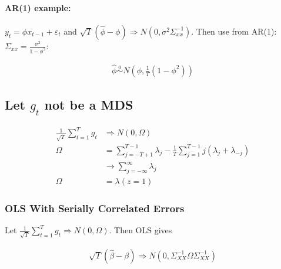 

\paragraph{AR(1) example:} $y_t = \phi x_{t-1}+\varepsilon_t$ and $\sqrt{T}(\widehat{\phi}-\phi) \Rightarrow N\left(0, \sigma^2 \Sigma_{x x}^{-1} \right)$. Then use from AR(1): $\Sigma_{x x}=\frac{\sigma^2}{1-\phi^2}$:

\begin{align*}
    \widehat{\phi} \stackrel{a}{\sim} N\left(\phi, \frac{1}{T}\left(1-\phi^2\right)\right)
\end{align*}

\subsection{Let $g_t$ not be a MDS}

\begin{align*}
    \frac{1}{\sqrt{T}} \sum_{t=1}^T g_t &\Rightarrow N(0, \Omega) \\
    \Omega &= \sum_{j=-T+1}^{T-1} \lambda_j-\frac{1}{T} \sum_{j=1}^{T-1} j\left(\lambda_j+\lambda_{-j}\right) \\
    & \rightarrow \sum_{j=-\infty}^{\infty} \lambda_j \\
    \Omega &= \lambda(z=1)
\end{align*}

\subsubsection{OLS With Serially Correlated Errors}

Let $\frac{1}{\sqrt{T}} \sum_{t=1}^T g_t \Rightarrow N(0, \Omega)$. Then OLS gives

\begin{align*}
    \sqrt{T}(\hat{\beta}-\beta) \Rightarrow N\left(0, \Sigma_{X X}^{-1} \Omega \Sigma_{X X}^{-1}\right)
\end{align*}

